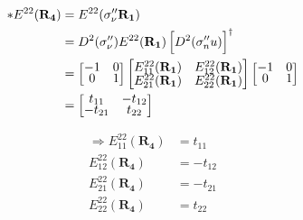 \documentclass{article}
\begin{document}
\begin{align*}
    \ast E^{22}(\mathbf{R_4}) & = E^{22}(\sigma''_\nu\mathbf{ R_1})                                               \\
                              & = D^2(\sigma''_\nu)  E^{22}(\mathbf{R_1}) \left[ D^2(\sigma''_nu) \right]^\dagger \\
                              &
    =
    \begin{bmatrix}
        \renewcommand{\arraystretch}{0.72}
        -1 & 0 \\
        0  & 1
    \end{bmatrix}
    \begin{bmatrix}
        E_{11}^{22}(\mathbf{R_1}) & E_{12}^{22}(\mathbf{R_1}) \\
        E_{21}^{22}(\mathbf{R_1}) & E_{22}^{22}(\mathbf{R_1})
    \end{bmatrix}
    \begin{bmatrix}
        -1 & 0 \\
        0  & 1
    \end{bmatrix}                                                                                                \\
                              & = \begin{bmatrix}
                                      t_{11}  & -t_{12} \\
                                      -t_{21} & t_{22}
                                  \end{bmatrix}
\end{align*}

\begin{align*}
    \Rightarrow E_{11}^{22}(\mathbf{R_4}) & = t_{11}  \\
    E_{12}^{22}(\mathbf{R_4})             & = -t_{12} \\
    E_{21}^{22}(\mathbf{R_4})             & = -t_{21} \\
    E_{22}^{22}(\mathbf{R_4})             & = t_{22}  \\
\end{align*}
\end{document}
